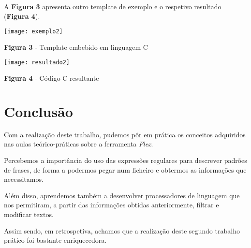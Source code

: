 \documentclass{article}
\begin{document}
\newpage
A \textbf{Figura 3} apresenta outro template de exemplo e o respetivo resultado (\textbf{Figura 4}).

\begin{center}
    \texttt{[image: exemplo2]}
    \newline
    \caption{\textbf{Figura 3} - Template embebido em linguagem C}
\end{center}

\begin{center}
    \texttt{[image: resultado2]}
    \caption{\textbf{Figura 4} - Código C resultante}
\end{center}



\newpage
\section{Conclusão}

Com a realização deste trabalho, pudemos pôr em prática os conceitos adquiridos nas aulas teórico-práticas sobre a ferramenta \emph{Flex}.

Percebemos a importância do uso das expressões regulares para descrever padrões de frases, de forma a podermos pegar num ficheiro e obtermos as informações que necessitamos.

Além disso, aprendemos também a desenvolver processadores de linguagem que nos permitiram, a partir das informações obtidas anteriormente, filtrar e modificar textos.

Assim sendo, em retrospetiva, achamos que a realização deste segundo trabalho prático foi bastante enriquecedora.
\end{document}
